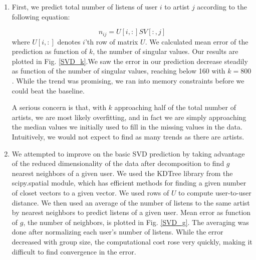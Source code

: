 \documentclass[11pt]{article}
\begin{document}
\begin{enumerate}
\item First, we predict total number of listens of user $i$ to artist $j$ according to the following equation:

\begin{equation}
n_{ij} = U[i,:]SV[:,j]
\end{equation}
where $U[i,:]$ denotes $i$'th row of matrix $U$. We calculated mean error of the prediction as function of $k$, the number of singular values. Our results are plotted in Fig. \ref{SVD_k}.We saw the error in our prediction decrease steadily as function of the number of singular values, reaching below 160 with $k = 800$. While the trend was promising, we ran into memory constraints before we could beat the baseline. 

A serious concern is that, with $k$ approaching half of the total number of artists, we are most likely overfitting, and in fact we are simply approaching the median values we initially used to fill in the missing values in the data. Intuitively, we would not expect to find as many trends as there are artists.

\item We attempted to improve on the basic SVD prediction by taking advantage of the reduced dimensionality of the data after decomposition to find $g$ nearest neighbors of a given user. We used  the KDTree library from the scipy.spatial module, which has efficient methods for finding a given number of closet vectors to a given vector. We used rows of $U$ to compute user-to-user distance. We then used an average of the number of listens to the same artist by nearest neighbors to predict listens of a given user. Mean error as function of $g$, the number of neighbors, is plotted in Fig. \ref{SVD_g}. The averaging was done after normalizing each user's number of listens. While the error decreased with group size, the computational cost rose very quickly, making it difficult to find convergence in the error.
\end{enumerate}
\end{document}
